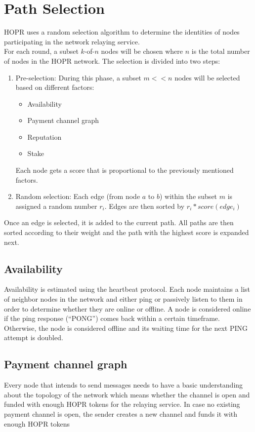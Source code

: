 \section{Path Selection}
HOPR uses a random selection algorithm to determine the identities of nodes participating in the network relaying service.
\\For each round, a subset $k$-of-$n$ nodes will be chosen where $n$ is the total number of nodes in the HOPR network. The selection is divided into two steps:
\begin{enumerate}
    \item Pre-selection: 
    During this phase, a subset $m<<n$ nodes will be selected based on different factors:
    \begin{itemize}
        \item Availability
        \item Payment channel graph
        \item Reputation
        \item Stake
    \end{itemize}
Each node gets a score that is proportional to the previously mentioned factors.
\item Random selection: 
Each edge (from node $a$ to $b$) within the subset $m$ is assigned a random number $r_i$. Edges are then sorted by $r_i*score(edge_i)$
\end{enumerate}
Once an edge is selected, it is added to the current path. All paths are then sorted according to their weight and the path with the highest score is expanded next.


\subsection{Availability}
Availability is estimated using the heartbeat protocol.
Each node maintains a list of neighbor nodes in the network and either ping or passively listen to them in order to determine whether they are online or offline.
A node is considered online if the ping response (“PONG”) comes back within a certain timeframe. Otherwise, the node is considered offline and its waiting time for the next PING attempt is doubled.


\subsection{Payment channel graph}
Every node that intends to send messages needs to have a basic understanding about the topology of the network which means whether the channel is open and funded with enough HOPR tokens for the relaying service. In case no existing payment channel is open, the sender creates a new channel and funds it with enough HOPR tokens

